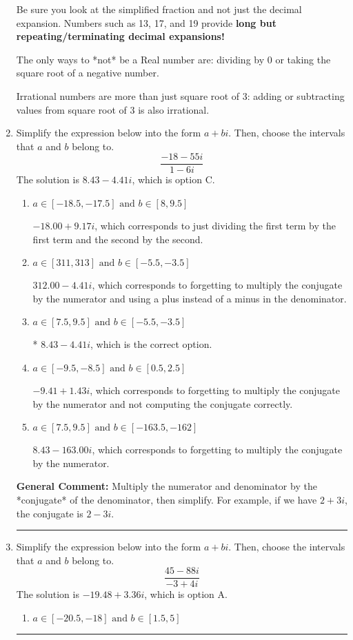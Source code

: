 \documentclass{extbook}[14pt]
\newcommand{\litem}[1]{\item #1

\rule{\textwidth}{0.4pt}}
\begin{document}
\begin{enumerate}
{ Be sure you look at the simplified fraction and not just the decimal expansion. Numbers such as 13, 17, and 19 provide \textbf{long but repeating/terminating decimal expansions!} 
 
 The only ways to *not* be a Real number are: dividing by 0 or taking the square root of a negative number. 
 
 Irrational numbers are more than just square root of 3: adding or subtracting values from square root of 3 is also irrational.
}
\litem{
Simplify the expression below into the form $a+bi$. Then, choose the intervals that $a$ and $b$ belong to.
\[ \frac{-18 - 55 i}{1 - 6 i} \]The solution is \( 8.43  - 4.41 i \), which is option C.\begin{enumerate}[label=\Alph*.]
\item \( a \in [-18.5, -17.5] \text{ and } b \in [8, 9.5] \)

 $-18.00  + 9.17 i$, which corresponds to just dividing the first term by the first term and the second by the second.
\item \( a \in [311, 313] \text{ and } b \in [-5.5, -3.5] \)

 $312.00  - 4.41 i$, which corresponds to forgetting to multiply the conjugate by the numerator and using a plus instead of a minus in the denominator.
\item \( a \in [7.5, 9.5] \text{ and } b \in [-5.5, -3.5] \)

* $8.43  - 4.41 i$, which is the correct option.
\item \( a \in [-9.5, -8.5] \text{ and } b \in [0.5, 2.5] \)

 $-9.41  + 1.43 i$, which corresponds to forgetting to multiply the conjugate by the numerator and not computing the conjugate correctly.
\item \( a \in [7.5, 9.5] \text{ and } b \in [-163.5, -162] \)

 $8.43  - 163.00 i$, which corresponds to forgetting to multiply the conjugate by the numerator.
\end{enumerate}

\textbf{General Comment:} Multiply the numerator and denominator by the *conjugate* of the denominator, then simplify. For example, if we have $2+3i$, the conjugate is $2-3i$.
}
\litem{
Simplify the expression below into the form $a+bi$. Then, choose the intervals that $a$ and $b$ belong to.
\[ \frac{45 - 88 i}{-3 + 4 i} \]The solution is \( -19.48  + 3.36 i \), which is option A.\begin{enumerate}[label=\Alph*.]
\item \( a \in [-20.5, -18] \text{ and } b \in [1.5, 5] \)


\end{enumerate}}
\end{enumerate}
\end{document}
